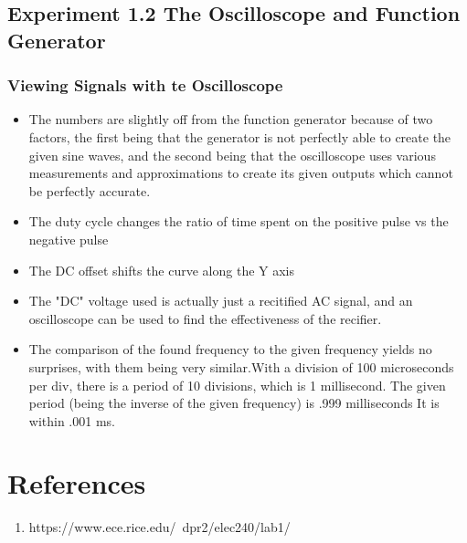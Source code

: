 \documentclass[10pt]{article}
\begin{document}
	\subsection{Experiment 1.2 The Oscilloscope and Function Generator}
	\subsubsection{Viewing Signals with te Oscilloscope}
	\begin{itemize}
	\item The numbers are slightly off from the function generator because of two factors, the first being that the generator is not perfectly able to create the given sine waves, and the second being that the oscilloscope uses various measurements and approximations to create its given outputs which cannot be perfectly accurate.
	\item The duty cycle changes the ratio of time spent on the positive pulse vs the negative pulse
	\item The DC offset shifts the curve along the Y axis
	\item The "DC" voltage used is actually just a recitified AC signal, and an oscilloscope can be used to find the effectiveness of the recifier.
	\item The comparison of the found frequency to the given frequency yields no surprises, with them being very similar.With a division of 100 microseconds per div, there is a period of 10 divisions, which is 1 millisecond. The given period (being the inverse of the given frequency) is .999 milliseconds It is within .001 ms.

	\end{itemize}

	\medskip
	
	
	\section{References}
	
	\begin{enumerate}
		\item https://www.ece.rice.edu/~dpr2/elec240/lab1/
	\end{enumerate}
	
\end{document}
